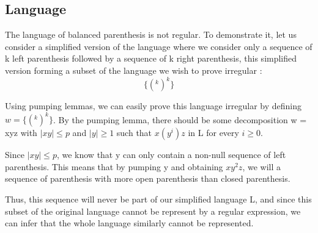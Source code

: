 \documentclass[a4paper, 11pt]{article}
\begin{document}
    \subsection{Language}

    	The language of balanced parenthesis is not regular.
    	To demonstrate it, let us consider a simplified version of the language
    	where we consider only a sequence of k left parenthesis followed by
    	a sequence of k right parenthesis, this simplified version forming
    	a subset of the language we wish to prove irregular :
    	\newline
    	$$\{(^k )^k\}$$

    	Using pumping lemmas, we can easily prove this language irregular by defining
    	$w = \{(^k )^k\}$. By the pumping lemma, there should be some decomposition
    	w = xyz with $|xy| \le p$ and $|y| \ge 1$ such that $x(y^i)z$
    	in L for every $i \ge 0$. \newline

    	Since $|xy| \le p$, we know that y can only contain a non-null sequence of
    	left parenthesis. This means that by pumping y and obtaining $xy^2 z$, we will
    	a sequence of parenthesis with more open parenthesis than closed parenthesis.
    	\newline

    	Thus, this sequence will never be part of our simplified language L, and since
    	this subset of the original language cannot be represent by a regular expression,
    	we can infer that the whole language similarly cannot be represented.
\end{document}
